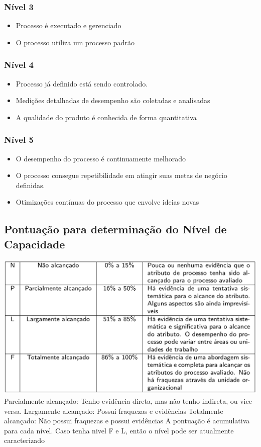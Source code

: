 \documentclass{article}
\begin{document}
	\subsubsection{Nível 3}
		\begin{itemize}
		\item Processo é executado e gerenciado
		\item O processo utiliza um processo padrão
		
		\end{itemize}
	
	\subsubsection{Nível 4}
		\begin{itemize}
		\item Processo já definido está sendo controlado.
		\item Medições detalhadas de desempenho são coletadas e analisadas
		\item A qualidade do produto é conhecida de forma quantitativa
		
		\end{itemize}
	
	\subsubsection{Nível 5}
		\begin{itemize}
		\item O desempenho do processo é continuamente melhorado
		\item O processo consegue repetibilidade em atingir suas metas de negócio definidas.	
		\item Otimizações contínuas do processo que envolve ideias novas
		
		\end{itemize}				
	
\subsection{Pontuação para determinação do Nível de Capacidade}

	\includegraphics[scale=0.35]{tabela_pontuacao}
	Parcialmente alcançado: Tenho evidência direta, mas não tenho indireta, ou vice-versa.
	Largamente alcançado: Possui fraquezas e evidências
	Totalmente alcançado: Não possui fraquezas e possui evidências
	A pontuação é acumulativa para cada nível.
	Caso tenha nivel F e L, então o nível pode ser atualmente caracterizado
\end{document}
